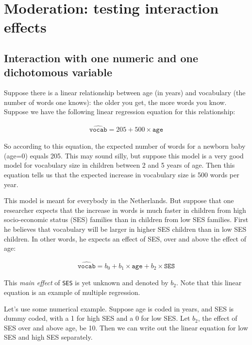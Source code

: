 
\chapter{Moderation: testing interaction effects}\label{chap:moderation}





\section{Interaction with one numeric and one dichotomous variable}

Suppose there is a linear relationship between age (in years) and vocabulary (the number of words one knows): the older you get, the more words you know. Suppose we have the following linear regression equation for this relationship:


\begin{eqnarray}
\widehat{\texttt{vocab}} = 205 + 500 \times \texttt{age} 
\end{eqnarray}

So according to this equation, the expected number of words for a newborn baby (age=0) equals 205. This may sound silly, but suppose this model is a very good model for vocabulary size in children between 2 and 5 years of age. Then this equation tells us that the expected increase in vocabulary size is 500 words per year.

This model is meant for everybody in the Netherlands. But suppose that one researcher expects that the increase in words is much faster in children from high socio-economic status (SES) families than in children from low SES families. First he believes that vocabulary will be larger in higher SES children than in low SES children. In other words, he expects an effect of SES, over and above the effect of age:

\begin{eqnarray}
\widehat{\texttt{vocab}} = b_0 + b_1 \times \texttt{age} + b_2 \times \texttt{SES}
\end{eqnarray}

This \textit{main effect} of \texttt{SES} is yet unknown and denoted by $b_2$. Note that this linear equation is an example of multiple regression.


Let's use some numerical example. Suppose age is coded in years, and SES is dummy coded, with a 1 for high SES and a 0 for low SES. Let $b_2$, the effect of SES over and above age, be 10. Then we can write out the linear equation for low SES and high SES separately.


